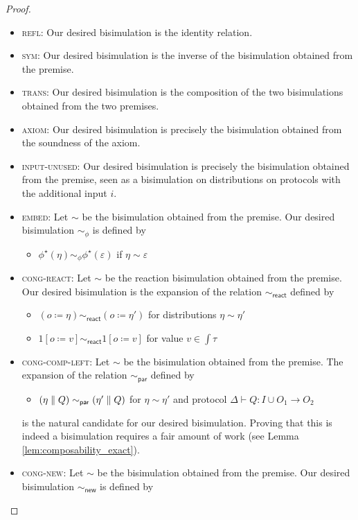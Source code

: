 \begin{proof}
\begin{itemize}
\item \textsc{refl}: Our desired bisimulation is the identity relation.
\item \textsc{sym}: Our desired bisimulation is the inverse of the bisimulation obtained from the premise.
\item \textsc{trans}: Our desired bisimulation is the composition of the two bisimulations obtained from the two premises.
\item \textsc{axiom}: Our desired bisimulation is precisely the bisimulation obtained from the soundness of the axiom.
\item \textsc{input-unused}: Our desired bisimulation is precisely the bisimulation obtained from the premise, seen as a bisimulation on distributions on protocols with the additional input $i$.
\item \textsc{embed}: Let $\sim$ be the bisimulation obtained from the premise. Our desired bisimulation $\sim_\phi$ is defined by
\begin{itemize}
\item $\phi^\star(\eta) \sim_\phi \phi^\star(\varepsilon)$ if $\eta \sim \varepsilon$
\end{itemize}
\item \textsc{cong-react}: Let $\sim$ be the reaction bisimulation obtained from the premise. Our desired bisimulation is the expansion of the relation $\sim_{\mathsf{react}}$ defined by
\begin{itemize}
\item $(o \coloneqq \eta) \sim_{\mathsf{react}} (o \coloneqq \eta')$ for distributions $\eta \sim \eta'$
\item $1[o \coloneqq v] \sim_{\mathsf{react}} 1[o \coloneqq v]$ for  value $v \in \int{\tau}$
\end{itemize}
\item \textsc{cong-comp-left}: Let $\sim$ be the bisimulation obtained from the premise. The expansion of the relation $\sim_{\mathsf{par}}$ defined by
\begin{itemize}
\item $(\eta \; \| \; Q) \sim_{\mathsf{par}} (\eta' \; \| \; Q)$ for $\eta \sim \eta'$ and protocol $\Delta \vdash Q : I \cup O_1 \to O_2$
\end{itemize}
is the natural candidate for our desired bisimulation. Proving that this is indeed a bisimulation requires a fair amount of work (see Lemma \ref{lem:composability_exact}).
\item \textsc{cong-new}: Let $\sim$ be the bisimulation obtained from the premise. Our desired bisimulation $\sim_{\mathsf{new}}$ is defined by

\end{itemize}
\end{proof}
